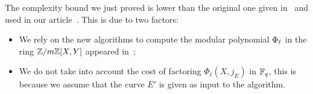 \begin{remark}
  The complexity bound we just proved is lower than the original one
  given in~\cite{lercier+sirvent08} and used in our
  article~\cite{df10}. This is due to two factors:
  \begin{itemize}
  \item We rely on the new algorithms to compute the modular
    polynomial $\Phi_\ell$ in the ring $\mathbb{Z}/m\mathbb{Z}[X,Y]$ appeared
    in~\cite{sutherland10:modpol};
  \item We do not take into account the cost of factoring
    $\Phi_\ell(X,j_E)$ in $\mathbb{F}_q$, this is because we assume that the
    curve $E'$ is given as input to the algorithm.
  \end{itemize}
\end{remark}



%

